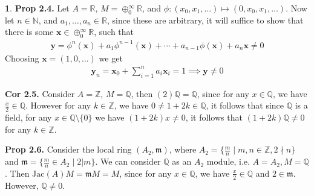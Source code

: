 \documentclass[11pt]{article}
\theoremstyle{definition}
\newtheorem{pb}{}
\newcommand{\set}[1]{\{#1\}}
\newcommand{\jac}{\text{Jac}}
\begin{document}
    \begin{pb}
        \textbf{Prop 2.4.} Let \(A = \mathbb{R}\), \(M = \oplus_{0}^\infty \mathbb{R}\), and \(\phi: (x_0,x_1,\hdots) \mapsto (0,x_0,x_1, \hdots)\). Now let \(n \in \mathbb{N}\), and \(a_1, \hdots, a_n \in \mathbb{R}\), since these are arbitrary, it will suffice to show that there is some \(\mathbf{x} \in \oplus_{0}^\infty \mathbb{R}\), such that
        \begin{align*}
            \mathbf{y} = \phi^n(\mathbf{x}) + a_1\phi^{n-1}(\mathbf{x}) + \cdots + a_{n-1}\phi(\mathbf{x}) + a_n\mathbf{x} \neq 0
        \end{align*}
        Choosing \(\mathbf{x} = (1,0,\hdots)\) we get
        \begin{align*}
            \mathbf{y}_n = \mathbf{x}_0 + \sum_{i=1}^n a_i\mathbf{x}_i = 1 \implies \mathbf{y} \neq 0
        \end{align*}

        \textbf{Cor 2.5.} Consider \(A = \mathbb{Z}\), \(M = \mathbb{Q}\), then \((2)\mathbb{Q} = \mathbb{Q}\), since for any \(x \in \mathbb{Q}\), we have \(\frac{x}{2} \in \mathbb{Q}\). However for any \(k \in \mathbb{Z}\), we have \(0 \neq 1 + 2k \in \mathbb{Q}\), it follows that since \(\mathbb{Q}\) is a field, for any \(x \in \mathbb{Q} \setminus \set{0}\) we have \((1+2k)x \neq 0\), it follows that \((1 + 2k)\mathbb{Q} \neq 0\) for any \(k \in \mathbb{Z}\).

        \textbf{Prop 2.6.} Consider the local ring \((A_2,\mathfrak{m})\), where \(A_2 = \set{\frac{m}{n} \mid m,n \in \mathbb{Z}, 2 \nmid n}\) and \(\mathfrak{m} = \set{\frac{m}{n} \in A_2 \mid 2 \vert m}\). We can consider \(\mathbb{Q}\) as an \(A_2\) module, i.e. \(A = A_2, M = \mathbb{Q}\). 
        Then \(\jac(A)M = \mathfrak{m}M = M\), since for any \(x \in \mathbb{Q}\), we have \(\frac{x}{2} \in \mathbb{Q}\) and \(2 \in \mathfrak{m}\). However, \(\mathbb{Q} \neq 0\).
    \end{pb}
\end{document}
